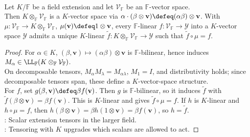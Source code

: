 \begin{proposition} \label{prop:scalar-extension-by-tensor-product} \\
Let $K/\mathbb{F}$ be a field extension and let $\mathcal{V}_{\mathbb{F}}$ be an $\mathbb{F}$-vector space.\\
Then $K\otimes_{\mathbb{F}}\mathcal{V}_{\mathbb{F}}$ is a $K$-vector space via $\alpha\cdot(\beta\otimes\mathbf{v})\defeq(\alpha\beta)\otimes\mathbf{v}$. With $\mu:\mathcal{V}_{\mathbb{F}}\to K\otimes_{\mathbb{F}}\mathcal{V}_{\mathbb{F}}$, $\mu(\mathbf{v})\defeq1\otimes\mathbf{v}$, every $\mathbb{F}$-linear $f:\mathcal{V}_{\mathbb{F}}\to\mathcal{Y}$ into a $K$-vector space $\mathcal{Y}$ admits a unique $K$-linear $\widetilde{f}:K\otimes_{\mathbb{F}}\mathcal{V}_{\mathbb{F}}\to\mathcal{Y}$ such that $\widetilde{f}\circ\mu=f$.
\begin{proof}
For $\alpha\in K$, $(\beta,\mathbf{v})\mapsto(\alpha\beta)\otimes\mathbf{v}$ is $\mathbb{F}$-bilinear, hence induces $M_\alpha\in\LL_{\mathbb{F}}(K\otimes_{\mathbb{F}}\mathcal{V}_{\mathbb{F}})$.\\
On decomposable tensors, $M_\alpha M_\lambda=M_{\alpha\lambda}$, $M_1=I$, and distributivity holds; since decomposable tensors span, these define a $K$-vector-space structure.\\
For $f$, set $g(\beta,\mathbf{v})\defeq\beta f(\mathbf{v})$. Then $g$ is $\mathbb{F}$-bilinear, so it induces $\widetilde{f}$ with $\widetilde{f}(\beta\otimes\mathbf{v})=\beta f(\mathbf{v})$. This is $K$-linear and gives $\widetilde{f}\circ\mu=f$. If $h$ is $K$-linear and $h\circ\mu=f$, then $h(\beta\otimes\mathbf{v})=\beta h(1\otimes\mathbf{v})=\beta f(\mathbf{v})$, so $h=\widetilde{f}$.\\
: Scalar extension tensors in the larger field.\\
: Tensoring with $K$ upgrades which scalars are allowed to act.
\end{proof}
\end{proposition}
